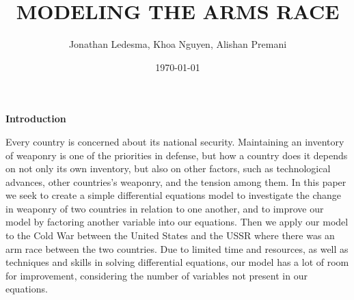 

\title{MODELING THE ARMS RACE}		%


\author{Jonathan Ledesma, Khoa Nguyen, Alishan Premani}					%


\date{\today}				%


\maketitle		%
			

\begin{center}
{\large \bfseries Introduction} %
\end{center}

Every country is concerned about its national security. Maintaining an inventory of weaponry is one of the priorities in defense, but how a country does it depends on not only its own inventory, but also on other factors, such as technological advances, other countries's weaponry, and the tension among them. In this paper we seek to create a simple differential equations model to investigate the change in weaponry of two countries in relation to one another, and to improve our model by factoring another variable into our equations. Then we apply our model to the Cold War between the United States and the USSR where there was an arm race between the two countries. Due to limited time and resources, as well as techniques and skills in solving differential equations, our model has a lot of room for improvement, considering the number of variables not present in our equations.

\newpage

